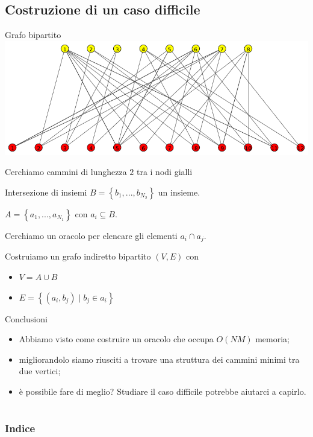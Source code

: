 \documentclass{beamer}
\theoremstyle{plain}
\theoremstyle{definition}
\theoremstyle{remark}
\newcommand{\set}[1]{\left\{#1\right\}}
\newcommand{\pa}[1]{\left(#1\right)}
\begin{document}
\subsection{Costruzione di un caso difficile}

\begin{frame}{Grafo bipartito}
  \includegraphics[width=\textwidth]{bipartito}
  
  Cerchiamo cammini di lunghezza $2$ tra i nodi gialli
\end{frame}

\begin{frame}{Intersezione di insiemi}
  $B = \set{ b_1,..., b_{N_2}}$ un insieme.

  $A = \set{ a_1,..., a_{N_1}}$ con $a_i \subseteq B$.

  Cerchiamo un oracolo per elencare gli elementi $a_i \cap a_j$.
  \vfill \pause

  Costruiamo un grafo indiretto bipartito $(V,E)$ con
  \begin{itemize}
  \item $V = A \cup B$
  \item $E = \set{ \pa{a_i, b_j} \mid b_j \in a_i }$
  \end{itemize}
\end{frame}

\begin{frame}{Conclusioni}
  \begin{itemize}
  \item<1-> Abbiamo visto come costruire un oracolo che occupa $O\pa{NM}$
    memoria;
  \item<1-> migliorandolo siamo riusciti a trovare una struttura dei
    cammini minimi tra due vertici;
  \item<2-> \`e possibile fare di meglio? Studiare il caso difficile
    potrebbe aiutarci a capirlo.
  \end{itemize}
\end{frame}


\section*{}

\begin{frame}[plain]
 \frametitle{Indice}
 \tableofcontents
\end{frame}
\end{document}
